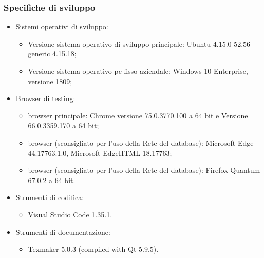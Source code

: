 \subsubsection{Specifiche di sviluppo}
\label{Specifiche di sviluppo}
\begin{itemize}
\item Sistemi operativi di sviluppo:
\begin{itemize}
\item Versione sistema operativo di sviluppo principale: Ubuntu 4.15.0-52.56-generic 4.15.18;
\item Versione sistema operativo pc fisso aziendale: Windows 10 Enterprise, versione 1809;
\end{itemize}
\item Browser di testing:
\begin{itemize}
\item browser principale: Chrome versione 75.0.3770.100 a 64 bit e Versione 66.0.3359.170 a 64 bit;
\item browser (sconsigliato per l'uso della Rete del database): Microsoft Edge 44.17763.1.0, Microsoft EdgeHTML 18.17763;
\item browser (sconsigliato per l'uso della Rete del database): Firefox Quantum 67.0.2 a 64 bit.
\end{itemize}
\item Strumenti di codifica:
\begin{itemize}
\item Visual Studio Code 1.35.1.
\end{itemize}
\item Strumenti di documentazione:
\begin{itemize}
\item Texmaker 5.0.3 (compiled with Qt 5.9.5).
\end{itemize}
\end{itemize}
